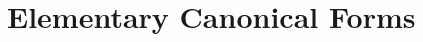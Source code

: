 \documentclass[class=linear-algebra,crop=false]{standalone}
\begin{document}
\chapter{Elementary Canonical Forms}
\end{document}
